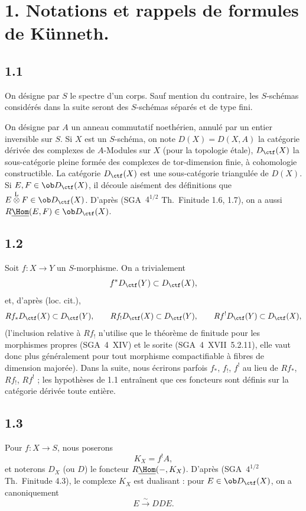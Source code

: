 \section*{1. Notations et rappels de formules de Künneth.}

\subsection*{1.1}
On désigne par $S$ le spectre d'un corps. Sauf mention du contraire, les $S$-schémas considérés dans la suite seront des $S$-schémas séparés et de type fini.

On désigne par $A$ un anneau commutatif noethérien, annulé par un entier inversible sur $S$. Si $X$ est un $S$-schéma, on note $D(X)=D(X,A)$ la catégorie dérivée des complexes de $A$-Modules sur $X$ (pour la topologie étale), $D_{\ctf}(X)$ la sous-catégorie pleine formée des complexes de tor-dimension finie, à cohomologie constructible. La catégorie $D_{\ctf}(X)$ est une sous-catégorie triangulée de $D(X)$. Si $E,F \in \ob D_{\ctf}(X)$, il découle aisément des définitions que $E \overset{\mathrm{L}}{\otimes} F \in \ob D_{\ctf}(X)$. D'après (SGA~$4^{1/2}$ Th.~Finitude 1.6, 1.7), on a aussi $R\underline{\Hom}(E,F) \in \ob D_{\ctf}(X)$.

\subsection*{1.2}
Soit $f:X\to Y$ un $S$-morphisme. On a trivialement
\[
f^{*}D_{\ctf}(Y) \subset D_{\ctf}(X),
\]
et, d'après (loc. cit.),
\[
Rf_{*}D_{\ctf}(X) \subset D_{\ctf}(Y),\qquad
Rf_{!}D_{\ctf}(X) \subset D_{\ctf}(Y),\qquad
Rf^{!}D_{\ctf}(Y) \subset D_{\ctf}(X),
\]
(l'inclusion relative à $Rf_{!}$ n'utilise que le théorème de finitude pour les morphismes propres (SGA~4~XIV) et le sorite (SGA~4~XVII~5.2.11), elle vaut donc plus généralement pour tout morphisme compactifiable à fibres de dimension majorée). Dans la suite, nous écrirons parfois $f_{*}$, $f_{!}$, $f^{!}$ au lieu de $Rf_{*}$, $Rf_{!}$, $Rf^{!}$ ; les hypothèses de 1.1 entraînent que ces foncteurs sont définis sur la catégorie dérivée toute entière.

\subsection*{1.3}
Pour $f:X\to S$, nous poserons
\[
K_X=f^{!}A,
\]
et noterons $D_X$ (ou $D$) le foncteur $R\underline{\Hom}(-,K_X)$. D'après (SGA~$4^{1/2}$ Th.~Finitude 
4.3), le
complexe $K_X$ est dualisant : pour $E\in\ob D_{\ctf}(X)$, on a canoniquement
\[
E \xrightarrow{\sim} DDE.
\]


